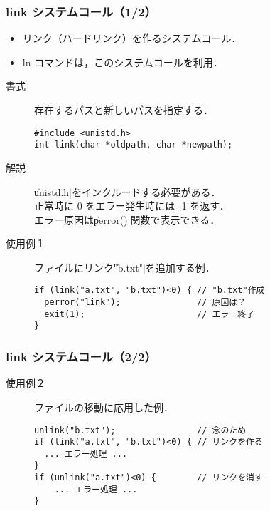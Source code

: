 \documentclass{beamer}                 %
\begin{document}
\begin{frame}[fragile]
  \frametitle{link システムコール（1/2）}
  \begin{itemize}
  \item リンク（ハードリンク）を作るシステムコール．
  \item ln コマンドは，このシステムコールを利用．
  \end{itemize}

  \begin{description}
  \item[書式]  存在するパスと新しいパスを指定する．
\begin{verbatim}
#include <unistd.h>
int link(char *oldpath, char *newpath);
\end{verbatim}

  \item[解説] \|unistd.h|をインクルードする必要がある．\\
  正常時に 0 をエラー発生時には -1 を返す．\\
  エラー原因は\|perror()|関数で表示できる．

  \item[使用例１] ファイルにリンク\|"b.txt"|を追加する例．
\begin{verbatim}
if (link("a.txt", "b.txt")<0) { // "b.txt"作成
  perror("link");               // 原因は？
  exit(1);                      // エラー終了
}
\end{verbatim}
  \end{description}
\end{frame}

\begin{frame}[fragile]
  \frametitle{link システムコール（2/2）}
  \begin{description}
  \item[使用例２] ファイルの移動に応用した例．
\begin{verbatim}
unlink("b.txt");                // 念のため
if (link("a.txt", "b.txt")<0) { // リンクを作る
  ... エラー処理 ...
}
if (unlink("a.txt")<0) {        // リンクを消す
    ... エラー処理 ...
}
\end{verbatim}
  \end{description}
\end{frame}
\end{document}
